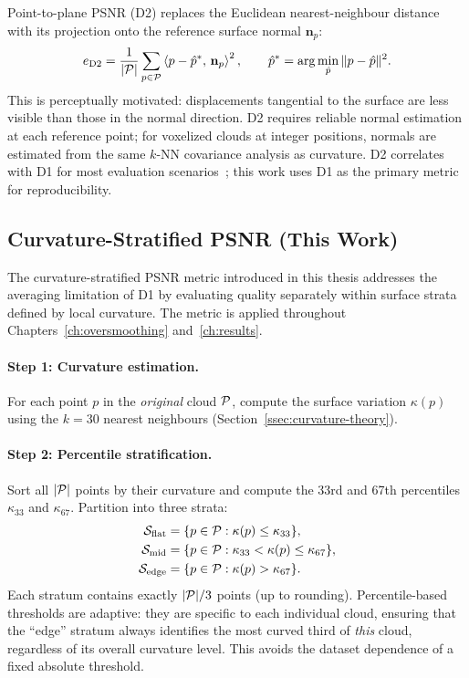 Point-to-plane PSNR (D2) replaces the Euclidean nearest-neighbour distance
with its projection onto the reference surface normal $\mathbf{n}_p$:
\begin{equation}
  e_{\text{D2}} = \frac{1}{|\mathcal{P}|}\sum_{p \in \mathcal{P}}
    \left\langle p - \hat{p}^*,\, \mathbf{n}_p \right\rangle^2,
  \qquad \hat{p}^* = \arg\min_{\hat{p}} \|p - \hat{p}\|^2.
\end{equation}
This is perceptually motivated: displacements tangential to the surface are
less visible than those in the normal direction.
D2 requires reliable normal estimation at each reference point; for voxelized
clouds at integer positions, normals are estimated from the same
$k$-NN covariance analysis as curvature.
D2 correlates with D1 for most evaluation scenarios~\cite{tian2017geometric}; this work uses D1
as the primary metric for reproducibility.

\subsection{Curvature-Stratified PSNR (This Work)}
\label{ssec:curvature-stratified}

The curvature-stratified PSNR metric introduced in this thesis addresses the
averaging limitation of D1 by evaluating quality separately within surface
strata defined by local curvature.
The metric is applied throughout Chapters~\ref{ch:oversmoothing}
and~\ref{ch:results}.

\paragraph{Step 1: Curvature estimation.}
For each point $p$ in the \emph{original} cloud $\mathcal{P}$, compute the surface
variation $\kappa(p)$ using the $k = 30$ nearest neighbours
(Section~\ref{ssec:curvature-theory}).

\paragraph{Step 2: Percentile stratification.}
Sort all $|\mathcal{P}|$ points by their curvature and compute the 33rd and 67th
percentiles $\kappa_{33}$ and $\kappa_{67}$.
Partition into three strata:
\begin{align}
  \mathcal{S}_{\text{flat}} &= \{p \in \mathcal{P} : \kappa(p) \leq \kappa_{33}\}, \\
  \mathcal{S}_{\text{mid}}  &= \{p \in \mathcal{P} : \kappa_{33} < \kappa(p) \leq \kappa_{67}\}, \\
  \mathcal{S}_{\text{edge}} &= \{p \in \mathcal{P} : \kappa(p) > \kappa_{67}\}.
\end{align}
Each stratum contains exactly $|\mathcal{P}|/3$ points (up to rounding).
Percentile-based thresholds are adaptive: they are specific to each individual
cloud, ensuring that the ``edge'' stratum always identifies the most curved
third of \emph{this} cloud, regardless of its overall curvature level.
This avoids the dataset dependence of a fixed absolute threshold.


